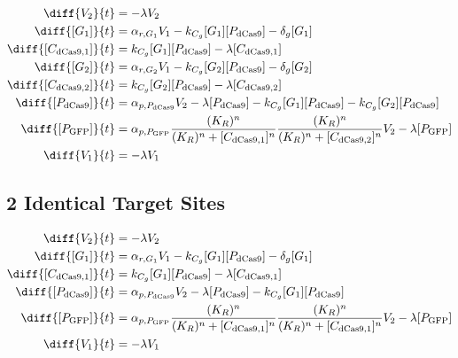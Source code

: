 \begin{align}
\diff{\constructGen{2}}{t} & = - \dilutionRate{}\constructGen{2}\\
\diff{\conc{\gRna{1}}}{t} & =  \txRate{\gRna{1}}\constructGen{1} - \gRnaBind{}\conc{\gRna{1}}\conc{\proSp{\cas{}}} - \rnaDegradeRate{}\conc{\gRna{1}}\\
\diff{\conc{\cplx{\cas}{1}}}{t} & =  \gRnaBind{}\conc{\gRna{1}}\conc{\proSp{\cas{}}} - \dilutionRate{}\conc{\cplx{\cas}{1}}\\
\diff{\conc{\gRna{2}}}{t} & =  \txRate{\gRna{2}}\constructGen{1} - \gRnaBind{}\conc{\gRna{2}}\conc{\proSp{\cas{}}} - \rnaDegradeRate{}\conc{\gRna{2}}\\
\diff{\conc{\cplx{\cas}{2}}}{t} & =  \gRnaBind{}\conc{\gRna{2}}\conc{\proSp{\cas{}}} - \dilutionRate{}\conc{\cplx{\cas}{2}}\\
\diff{\conc{\proSp{\cas{}}}}{t} & =  \txtlRate{\proSp{\cas{}}}\constructGen{2} - \dilutionRate{}\conc{\proSp{\cas{}}} - \gRnaBind{}\conc{\gRna{1}}\conc{\proSp{\cas{}}} - \gRnaBind{}\conc{\gRna{2}}\conc{\proSp{\cas{}}}\\
\diff{\conc{\proSp{\gfp}}}{t} & =  \txtlRate{\proSp{\gfp}}\frac{(K_R)^n}{(K_R)^n + \conc{\cplx{\cas}{1}}^n}\frac{(K_R)^n}{(K_R)^n + \conc{\cplx{\cas}{2}}^n}\constructGen{2} - \dilutionRate{}\conc{\proSp{\gfp}}\\
\diff{\constructGen{1}}{t} & = - \dilutionRate{}\constructGen{1}
\end{align}

\subsection{2 Identical Target Sites}
\label{s:Multisite_2_gRNA_Repression}

\begin{align}
\diff{\constructGen{2}}{t} & = - \dilutionRate{}\constructGen{2}\\
\diff{\conc{\gRna{1}}}{t} & =  \txRate{\gRna{1}}\constructGen{1} - \gRnaBind{}\conc{\gRna{1}}\conc{\proSp{\cas{}}} - \rnaDegradeRate{}\conc{\gRna{1}}\\
\diff{\conc{\cplx{\cas}{1}}}{t} & =  \gRnaBind{}\conc{\gRna{1}}\conc{\proSp{\cas{}}} - \dilutionRate{}\conc{\cplx{\cas}{1}}\\
\diff{\conc{\proSp{\cas{}}}}{t} & =  \txtlRate{\proSp{\cas{}}}\constructGen{2} - \dilutionRate{}\conc{\proSp{\cas{}}} - \gRnaBind{}\conc{\gRna{1}}\conc{\proSp{\cas{}}}\\
\diff{\conc{\proSp{\gfp}}}{t} & =  \txtlRate{\proSp{\gfp}}\frac{(K_R)^n}{(K_R)^n + \conc{\cplx{\cas}{1}}^n}\frac{(K_R)^n}{(K_R)^n + \conc{\cplx{\cas}{1}}^n}\constructGen{2} - \dilutionRate{}\conc{\proSp{\gfp}}\\
\diff{\constructGen{1}}{t} & = - \dilutionRate{}\constructGen{1}
\end{align}


